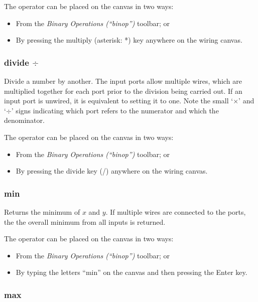 The operator can be placed on the canvas in two ways:
\begin{itemize}
\item From the \emph{Binary Operations (``binop'')} toolbar; or 
\item By pressing the multiply (asterisk: {*}) key anywhere on the wiring
canvas. 
\end{itemize}

\subsubsection{divide $\div$}


\label{Operation:divide} Divide a number by another. The input ports
allow multiple wires, which are multiplied together for each port
prior to the division being carried out. If an input port is unwired,
it is equivalent to setting it to one. Note the small `$\times$'
and `$\div$' signs indicating which port refers to the numerator
and which the denominator.

The operator can be placed on the canvas in two ways:
\begin{itemize}
\item From the \emph{Binary Operations (``binop'')} toolbar; or 
\item By pressing the divide key (/) anywhere on the wiring canvas. 
\end{itemize}

\subsubsection{min}


\label{Operation:min} Returns the minimum of $x$ and $y$. If multiple
wires are connected to the ports, the the overall minimum from all
inputs is returned.

The operator can be placed on the canvas in two ways:
\begin{itemize}
\item From the \emph{Binary Operations (``binop'')} toolbar; or 
\item By typing the letters ``min'' on the canvas and then pressing the
Enter key. 
\end{itemize}

\subsubsection{max}

